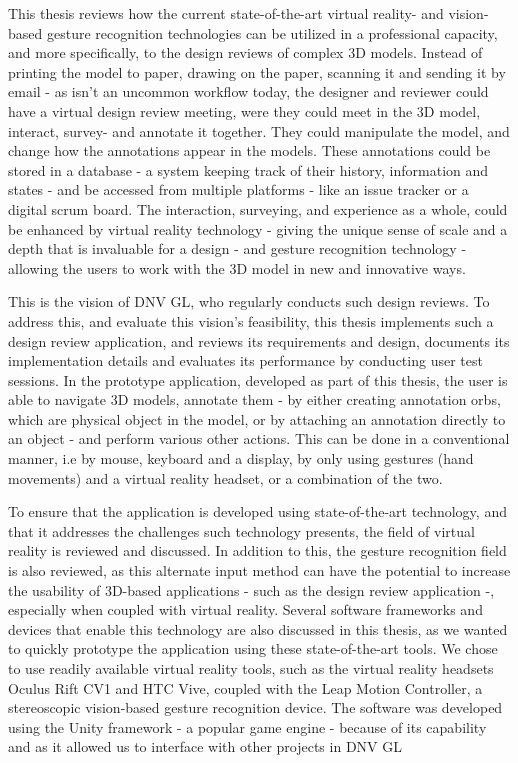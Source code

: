 






This thesis reviews how the current state-of-the-art virtual reality- and vision-based gesture recognition technologies can be utilized in a professional capacity, 
and more specifically, to the design reviews of complex 3D models. 
Instead of printing the model to paper, drawing on the paper, scanning it and sending it by email - as isn't an uncommon workflow today, 
the designer and reviewer could have a virtual design review meeting, were they could meet in the 3D model, interact, survey- and annotate it together. 
They could manipulate the model, and change how the annotations appear in the models.
These annotations could be stored in a database - a system keeping track of their history, information and states - and be accessed from multiple platforms - like 
an issue tracker or a digital scrum board. The interaction, surveying, and experience as a whole, could be enhanced by virtual reality technology -
giving the unique sense of scale and a depth that is invaluable for a design - 
and gesture recognition technology - allowing the users to work with the 3D model in new and innovative ways. 

This is the vision of DNV GL, who regularly conducts such design reviews. %
To address this, and evaluate this vision's feasibility, this thesis implements such a design review application, and 
reviews its requirements and design, documents its implementation details and evaluates its performance by conducting user test sessions.
In the prototype application, developed as part of this thesis, the user is able to navigate 3D models, annotate them - by either creating 
annotation orbs, which are physical object in the model, or by attaching an annotation directly to an object - and perform various other actions. 
This can be done in a conventional manner, i.e by mouse, keyboard and a display, by only using gestures (hand movements) and a virtual reality headset, or 
a combination of the two.

To ensure that the application is developed using state-of-the-art technology, and that it addresses the challenges such technology presents, 
the field of virtual reality is reviewed and discussed. In addition to this, the gesture recognition field is also reviewed, as this alternate 
input method can have the potential to increase the usability of 3D-based applications - such as the design review application -, especially when coupled with virtual reality.
Several software frameworks and devices that enable this technology are also discussed in this thesis, as we wanted to quickly prototype the 
application using these state-of-the-art tools.
We chose to use readily available virtual reality tools, such as the virtual reality headsets Oculus Rift CV1 and HTC Vive, coupled with
the Leap Motion Controller, a stereoscopic vision-based gesture recognition device. The software was developed using the Unity 
framework - a popular game engine - because of its capability and as it allowed us to interface with other projects in DNV GL


